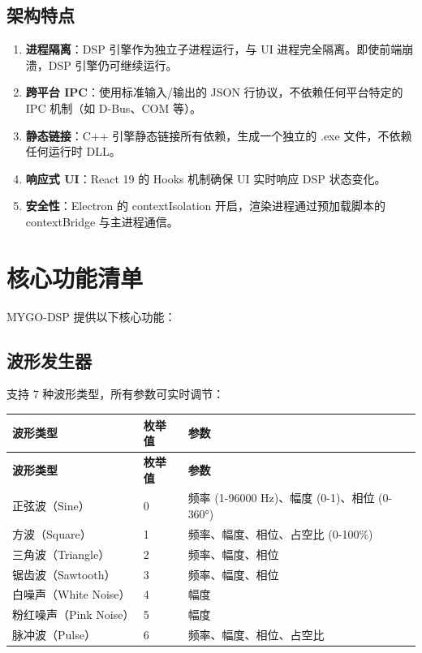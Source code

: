﻿\documentclass[12pt,a4paper,oneside]{ctexbook}
\begin{document}
\subsection{架构特点}

\begin{enumerate}
    \item \textbf{进程隔离}：DSP 引擎作为独立子进程运行，与 UI 进程完全隔离。即使前端崩溃，DSP 引擎仍可继续运行。
    \item \textbf{跨平台 IPC}：使用标准输入/输出的 JSON 行协议，不依赖任何平台特定的 IPC 机制（如 D-Bus、COM 等）。
    \item \textbf{静态链接}：C++ 引擎静态链接所有依赖，生成一个独立的 .exe 文件，不依赖任何运行时 DLL。
    \item \textbf{响应式 UI}：React 19 的 Hooks 机制确保 UI 实时响应 DSP 状态变化。
    \item \textbf{安全性}：Electron 的 contextIsolation 开启，渲染进程通过预加载脚本的 contextBridge 与主进程通信。
\end{enumerate}

\section{核心功能清单}

MYGO-DSP 提供以下核心功能：

\subsection{波形发生器}

支持 7 种波形类型，所有参数可实时调节：

\begin{longtable}{p{3cm}p{2.5cm}p{8cm}}
    \toprule
    \textbf{波形类型} & \textbf{枚举值} & \textbf{参数} \\
    \midrule
    \endfirsthead
    \toprule
    \textbf{波形类型} & \textbf{枚举值} & \textbf{参数} \\
    \midrule
    \endhead
    \bottomrule
    \endfoot
    正弦波（Sine） & 0 & 频率 (1-96000 Hz)、幅度 (0-1)、相位 (0-360°) \\
    方波（Square） & 1 & 频率、幅度、相位、占空比 (0-100\%) \\
    三角波（Triangle） & 2 & 频率、幅度、相位 \\
    锯齿波（Sawtooth） & 3 & 频率、幅度、相位 \\
    白噪声（White Noise） & 4 & 幅度 \\
    粉红噪声（Pink Noise） & 5 & 幅度 \\
    脉冲波（Pulse） & 6 & 频率、幅度、相位、占空比 \\
    \bottomrule
\end{longtable}
\end{document}

